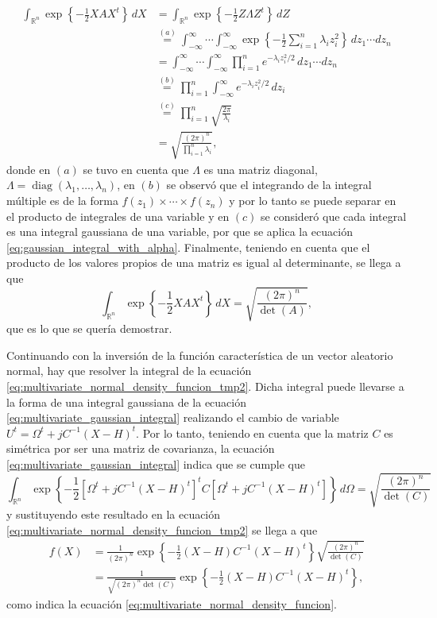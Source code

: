 \documentclass[a4paper]{report}
\begin{document}
\begin{align*}
 \int_{{\mathbb{R}^n}}\exp\left\{-\frac{1}{2}XAX^t\right\}\,dX&=\int_{{\mathbb{R}^n}}\exp\left\{-\frac{1}{2}Z\Lambda Z^t\right\}\,dZ\\
    &\overset{(a)}{=}\int_{-\infty}^\infty\cdots\int_{-\infty}^\infty \exp\left\{-\frac{1}{2}\sum_{i=1}^n\lambda_i z_i^2\right\}\,dz_1\cdots dz_n\\
    &=\int_{-\infty}^\infty\cdots\int_{-\infty}^\infty \prod_{i=1}^n e^{-\lambda_i z_i^2/2}\,dz_1\cdots dz_n\\
    &\overset{(b)}{=}\prod_{i=1}^n \int_{-\infty}^\infty e^{-\lambda_i z_i^2/2}\,dz_i\\
    &\overset{(c)}{=}\prod_{i=1}^n \sqrt{\frac{2\pi}{\lambda_i}}\\
    &=\sqrt{\frac{(2\pi)^n}{\prod_{i=1}^n\lambda_i}},
\end{align*}
donde en \((a)\) se tuvo en cuenta que \(\Lambda\) es una matriz diagonal, \(\Lambda=\operatorname{diag}(\lambda_1,\dots,\lambda_n)\), en \((b)\) se observó que el integrando de la integral múltiple es de la forma \(f(z_1)\times\cdots\times f(z_n)\) y por lo tanto se puede separar en el producto de integrales de una variable y en \((c)\) se consideró que cada integral es una integral gaussiana de una variable, por que se aplica la ecuación \ref{eq:gaussian_integral_with_alpha}. Finalmente, teniendo en cuenta que el producto de los valores propios de una matriz es igual al determinante, se llega a que
\[
 \int_{{\mathbb{R}^n}}\exp\left\{-\frac{1}{2}XAX^t\right\}\,dX=\sqrt{\frac{(2\pi)^n}{\det(A)}},
\]
que es lo que se quería demostrar.

Continuando con la inversión de la función característica de un vector aleatorio normal, hay que resolver la integral de la ecuación \ref{eq:multivariate_normal_density_funcion_tmp2}. Dicha integral puede llevarse a la forma de una integral gaussiana de la ecuación \ref{eq:multivariate_gaussian_integral} realizando el cambio de variable \(U^t=\Omega^t+jC^{-1}(X-H)^t\). Por lo tanto, teniendo en cuenta que la matriz \(C\) es simétrica por ser una matriz de covarianza, la ecuación \ref{eq:multivariate_gaussian_integral} indica que se cumple que 
\[
 \int_{{\mathbb{R}^n}}\exp\left\{-\frac{1}{2}\left[\Omega^t+jC^{-1}(X-H)^t\right]^tC\left[\Omega^t+jC^{-1}(X-H)^t\right]\right\}\,d\Omega=\sqrt{\frac{(2\pi)^n}{\det(C)}}
\]
y sustituyendo este resultado en la ecuación \ref{eq:multivariate_normal_density_funcion_tmp2} se llega a que
\begin{align*}
 f(X)&=\frac{1}{(2\pi)^n}\exp\left\{-\frac{1}{2}\left(X-H\right)C^{-1}\left(X-H\right)^t\right\}\sqrt{\frac{(2\pi)^n}{\det(C)}}\\
   &=\frac{1}{\sqrt{(2\pi)^n\det(C)}}\exp\left\{-\frac{1}{2}\left(X-H\right)C^{-1}\left(X-H\right)^t\right\},
\end{align*}
como indica la ecuación \ref{eq:multivariate_normal_density_funcion}.
\end{document}
